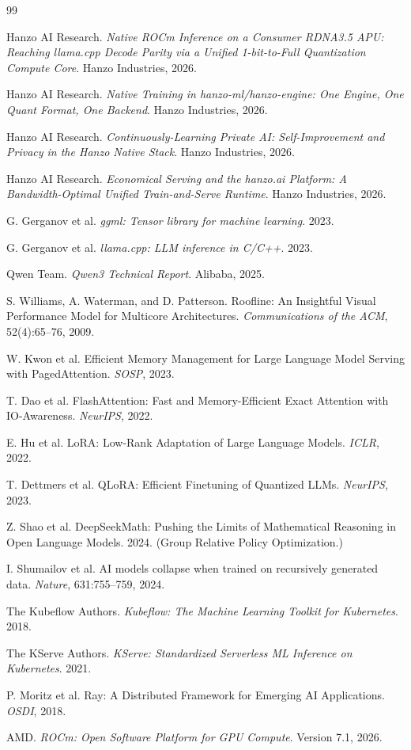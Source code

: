 \documentclass[11pt]{article}
\begin{document}
\begin{thebibliography}{99}

Hanzo AI Research. \textit{Native ROCm Inference on a Consumer RDNA3.5 APU: Reaching llama.cpp Decode Parity via a Unified 1-bit-to-Full Quantization Compute Core}. Hanzo Industries, 2026.

Hanzo AI Research. \textit{Native Training in hanzo-ml/hanzo-engine: One Engine, One Quant Format, One Backend}. Hanzo Industries, 2026.

Hanzo AI Research. \textit{Continuously-Learning Private AI: Self-Improvement and Privacy in the Hanzo Native Stack}. Hanzo Industries, 2026.

Hanzo AI Research. \textit{Economical Serving and the hanzo.ai Platform: A Bandwidth-Optimal Unified Train-and-Serve Runtime}. Hanzo Industries, 2026.

G. Gerganov et al. \textit{ggml: Tensor library for machine learning}. 2023.

G. Gerganov et al. \textit{llama.cpp: LLM inference in C/C++}. 2023.

Qwen Team. \textit{Qwen3 Technical Report}. Alibaba, 2025.

S. Williams, A. Waterman, and D. Patterson. Roofline: An Insightful Visual Performance Model for Multicore Architectures. \textit{Communications of the ACM}, 52(4):65--76, 2009.

W. Kwon et al. Efficient Memory Management for Large Language Model Serving with PagedAttention. \textit{SOSP}, 2023.

T. Dao et al. FlashAttention: Fast and Memory-Efficient Exact Attention with IO-Awareness. \textit{NeurIPS}, 2022.

E. Hu et al. LoRA: Low-Rank Adaptation of Large Language Models. \textit{ICLR}, 2022.

T. Dettmers et al. QLoRA: Efficient Finetuning of Quantized LLMs. \textit{NeurIPS}, 2023.

Z. Shao et al. DeepSeekMath: Pushing the Limits of Mathematical Reasoning in Open Language Models. 2024. (Group Relative Policy Optimization.)

I. Shumailov et al. AI models collapse when trained on recursively generated data. \textit{Nature}, 631:755--759, 2024.

The Kubeflow Authors. \textit{Kubeflow: The Machine Learning Toolkit for Kubernetes}. 2018.

The KServe Authors. \textit{KServe: Standardized Serverless ML Inference on Kubernetes}. 2021.

P. Moritz et al. Ray: A Distributed Framework for Emerging AI Applications. \textit{OSDI}, 2018.

AMD. \textit{ROCm: Open Software Platform for GPU Compute}. Version 7.1, 2026.

\end{thebibliography}
\end{document}
